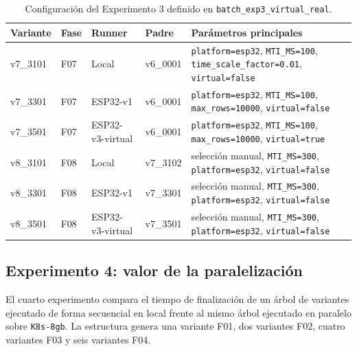 \begin{table}[htbp]
    \centering
    \caption{Configuración del Experimento 3 definido en \texttt{batch\_exp3\_virtual\_real}.}
    \label{tab:params-exp3-virtual-real}
    \begin{tabular}{p{}p{}p{}p{}p{}}
        \hline
        \textbf{Variante} & \textbf{Fase} & \textbf{Runner} & \textbf{Padre} & \textbf{Parámetros principales} \\
        \hline
        v7\_3101 & F07 & Local & v6\_0001 & \texttt{platform=esp32}, \texttt{MTI\_MS=100}, \texttt{time\_scale\_factor=0.01}, \texttt{virtual=false} \\
        v7\_3301 & F07 & ESP32-v1 & v6\_0001 & \texttt{platform=esp32}, \texttt{MTI\_MS=100}, \texttt{max\_rows=10000}, \texttt{virtual=false} \\
        v7\_3501 & F07 & ESP32-v3-virtual & v6\_0001 & \texttt{platform=esp32}, \texttt{MTI\_MS=100}, \texttt{max\_rows=10000}, \texttt{virtual=true} \\
        v8\_3101 & F08 & Local & v7\_3102 & selección manual, \texttt{MTI\_MS=300}, \texttt{platform=esp32}, \texttt{virtual=false} \\
        v8\_3301 & F08 & ESP32-v1 & v7\_3301 & selección manual, \texttt{MTI\_MS=300}, \texttt{platform=esp32}, \texttt{virtual=false} \\
        v8\_3501 & F08 & ESP32-v3-virtual & v7\_3501 & selección manual, \texttt{MTI\_MS=300}, \texttt{platform=esp32}, \texttt{virtual=false} \\
        \hline
    \end{tabular}
\end{table}

\subsection{Experimento 4: valor de la paralelización}
\label{anexo:exp4-gantt}

El cuarto experimento compara el tiempo de finalización de un árbol de variantes ejecutado de forma secuencial en local frente al mismo árbol ejecutado en paralelo sobre \texttt{K8s-8gb}. La estructura genera una variante F01, dos variantes F02, cuatro variantes F03 y seis variantes F04.

